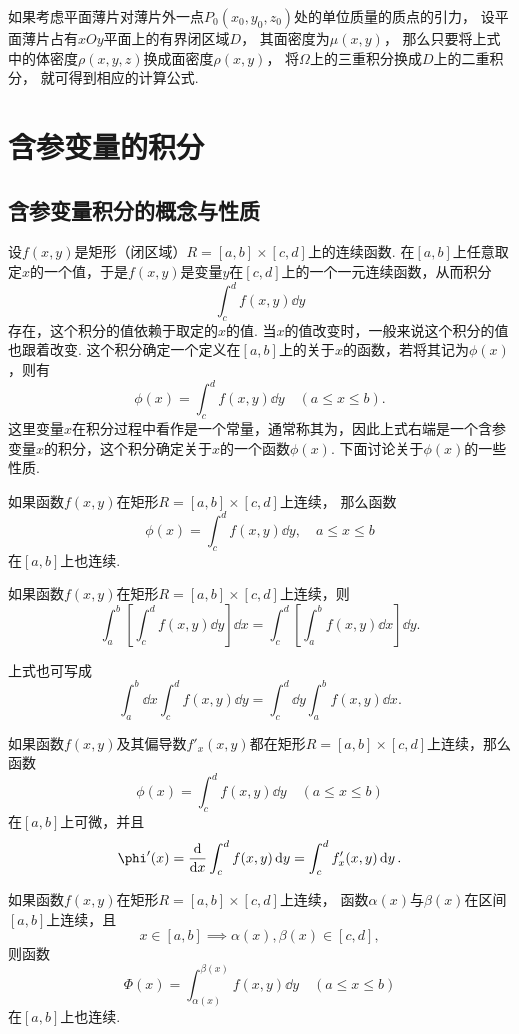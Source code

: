 如果考虑平面薄片对薄片外一点\(P_0(x_0,y_0,z_0)\)处的单位质量的质点的引力，
设平面薄片占有\(xOy\)平面上的有界闭区域\(D\)，
其面密度为\(\mu(x,y)\)，
那么只要将上式中的体密度\(\rho(x,y,z)\)换成面密度\(\rho(x,y)\)，
将\(\Omega\)上的三重积分换成\(D\)上的二重积分，
就可得到相应的计算公式.

\section{含参变量的积分}
\subsection{含参变量积分的概念与性质}
设\(f(x,y)\)是矩形（闭区域）\(R = [a,b]\times[c,d]\)上的连续函数.
在\([a,b]\)上任意取定\(x\)的一个值，于是\(f(x,y)\)是变量\(y\)在\([c,d]\)上的一个一元连续函数，从而积分\[
\int_c^d f(x,y) \dd{y}
\]存在，这个积分的值依赖于取定的\(x\)的值.
当\(x\)的值改变时，一般来说这个积分的值也跟着改变.
这个积分确定一个定义在\([a,b]\)上的关于\(x\)的函数，若将其记为\(\phi(x)\)，则有\[
\phi(x) = \int_c^d f(x,y) \dd{y}
\quad(a \leq x \leq b).
\]这里变量\(x\)在积分过程中看作是一个常量，通常称其为，因此上式右端是一个含参变量\(x\)的积分，这个积分确定关于\(x\)的一个函数\(\phi(x)\).
下面讨论关于\(\phi(x)\)的一些性质.

\begin{theorem}
如果函数\(f(x,y)\)在矩形\(R=[a,b]\times[c,d]\)上连续，
那么函数\[
\phi(x) = \int_c^d{f(x,y)\dd{y}}, \quad a \leq x \leq b
\]在\([a,b]\)上也连续.
\end{theorem}

\begin{theorem}
如果函数\(f(x,y)\)在矩形\(R=[a,b]\times[c,d]\)上连续，则\[
\int_a^b\left[\int_c^d f(x,y) \dd{y}\right] \dd{x}
=\int_c^d\left[\int_a^b f(x,y) \dd{x}\right] \dd{y}.
\]
\end{theorem}
上式也可写成\[
\int_a^b \dd{x} \int_c^d f(x,y) \dd{y}
=\int_c^d \dd{y} \int_a^b f(x,y) \dd{x}.
\]

\begin{theorem}
如果函数\(f(x,y)\)及其偏导数\(f'_x(x,y)\)都在矩形\(R=[a,b]\times[c,d]\)上连续，那么函数\[
\phi(x) = \int_c^d f(x,y) \dd{y}
\quad(a \leq x \leq b)
\]在\([a,b]\)上可微，并且\[
\phi'(x) = \dv{x} \int_c^d f(x,y) \dd{y}
= \int_c^d f'_x(x,y) \dd{y}.
\]
\end{theorem}

\begin{theorem}
如果函数\(f(x,y)\)在矩形\(R=[a,b]\times[c,d]\)上连续，
函数\(\alpha(x)\)与\(\beta(x)\)在区间\([a,b]\)上连续，且\[
x \in [a,b] \implies \alpha(x),\beta(x) \in [c,d],
\]则函数\[
\Phi(x) = \int_{\alpha(x)}^{\beta(x)} f(x,y)\dd{y}
\quad(a \leq x \leq b)
\]在\([a,b]\)上也连续.
\end{theorem}

